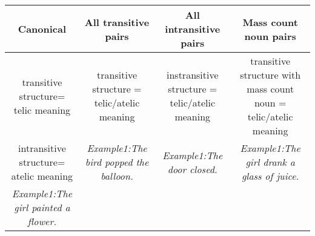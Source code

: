 \documentclass[11pt]{article}
\begin{document}
\begin{longtable}[]{@{}cccc@{}}
\toprule
\begin{minipage}[b]{0.16\columnwidth}\centering
Canonical\strut
\end{minipage} & \begin{minipage}[b]{0.25\columnwidth}\centering
All transitive pairs\strut
\end{minipage} & \begin{minipage}[b]{0.23\columnwidth}\centering
All intransitive pairs\strut
\end{minipage} & \begin{minipage}[b]{0.25\columnwidth}\centering
Mass count noun pairs\strut
\end{minipage}\tabularnewline
\midrule
\endhead
\begin{minipage}[t]{0.16\columnwidth}\centering
transitive structure= telic meaning\strut
\end{minipage} & \begin{minipage}[t]{0.25\columnwidth}\centering
transitive structure = telic/atelic meaning\strut
\end{minipage} & \begin{minipage}[t]{0.23\columnwidth}\centering
instransitive structure = telic/atelic meaning\strut
\end{minipage} & \begin{minipage}[t]{0.25\columnwidth}\centering
transitive structure with mass count noun = telic/atelic meaning\strut
\end{minipage}\tabularnewline
\begin{minipage}[t]{0.16\columnwidth}\centering
intransitive structure= atelic meaning\strut
\end{minipage} & \begin{minipage}[t]{0.25\columnwidth}\centering
\emph{Example1:The bird popped the balloon.}\strut
\end{minipage} & \begin{minipage}[t]{0.23\columnwidth}\centering
\emph{Example1:The door closed.}\strut
\end{minipage} & \begin{minipage}[t]{0.25\columnwidth}\centering
\emph{Example1:The girl drank a glass of juice.}\strut
\end{minipage}\tabularnewline
\begin{minipage}[t]{0.16\columnwidth}\centering
\emph{Example1:The girl painted a flower.}\strut
\end{minipage} & \begin{minipage}[t]{0.25\columnwidth}\centering

\end{minipage}
\end{longtable}
\end{document}
